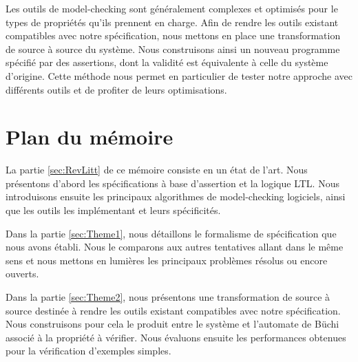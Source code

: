 Les outils de model-checking sont généralement complexes et optimisés
pour le types de propriétés qu'ils prennent en charge. Afin de rendre
les outils existant compatibles avec notre spécification, nous mettons
en place une transformation de source à source du système. Nous
construisons ainsi un nouveau programme spécifié par des assertions,
dont la validité est équivalente à celle du système d'origine. Cette
méthode nous permet en particulier de tester notre approche avec
différents outils et de profiter de leurs optimisations.

\section{Plan du mémoire}  %

La partie \ref{sec:RevLitt} de ce mémoire consiste en un état de l'art. Nous présentons
d'abord les spécifications à base d'assertion et la logique LTL. Nous
introduisons ensuite les principaux algorithmes de model-checking
logiciels, ainsi que les outils les implémentant et leurs spécificités.

Dans la partie \ref{sec:Theme1}, nous détaillons le formalisme de spécification que
nous avons établi. Nous le comparons aux autres tentatives allant dans
le même sens et nous mettons en lumières les principaux problèmes
résolus ou encore ouverts.

Dans la partie \ref{sec:Theme2}, nous présentons une transformation de source à source
destinée à rendre les outils existant compatibles avec notre
spécification. Nous construisons pour cela le produit entre le système
et l'automate de Büchi associé à la propriété à vérifier. Nous évaluons
ensuite les performances obtenues pour la vérification d'exemples
simples.
